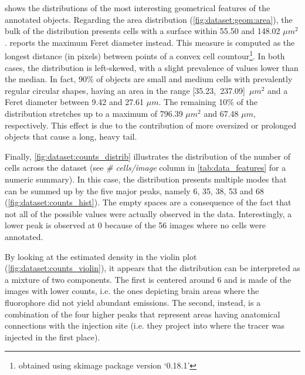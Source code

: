  shows the distributions of the most interesting geometrical features of the annotated objects.
Regarding the area distribution (\cref{fig:dataset:geom:area}), the bulk of the distribution presents cells with a surface within 55.50 and 148.02  $\mu m^2$.
 reports the maximum Feret diameter \cite{merkus2009particle} instead. This measure is computed as the longest distance (in pixels) between points of a convex cell countour\footnote{obtained using skimage package version `0.18.1'}.
In both cases, the distribution is left-skewed, with a slight prevalence of values lower than the median.
In fact, 90\% of objects are small and medium cells with prevalently regular circular shapes, having an area in the range \mbox{[35.23, 237.09]  $\mu m^2$} and a Feret diameter between 9.42 and 27.61  $\mu m$.
The remaining 10\% of the distribution stretches up to a maximum of 796.39  $\mu m^2$ and 67.48 $\mu m$, respectively.
This effect is due to the contribution of more oversized or prolonged objects that cause a long, heavy tail.

Finally, \ref{fig:dataset:counts_distrib} illustrates the distribution of the number of cells across the dataset (see \textit{\# cells/image} column in \cref{tab:data_features} for a numeric summary).
In this case, the distribution presents multiple modes that can be summed up by the five major peaks, namely 6, 35, 38, 53 and 68
(\cref{fig:dataset:counts_hist}).
The empty spaces are a consequence of the fact that not all of the possible values were actually observed in the data.
Interestingly, a lower peak is observed at 0 because of the 56 images where no cells were annotated.

By looking at the estimated density in the violin plot (\cref{fig:dataset:counts_violin}), it appears that the distribution can be interpreted as a mixture of two components.
The first is centered around 6 and is made of the images with lower counts, i.e. the ones depicting brain areas where the fluorophore did not yield abundant emissions.
The second, instead, is a combination of the four higher peaks that represent %
areas having anatomical connections with the injection site (i.e. they project into where the tracer was injected in the first place).


